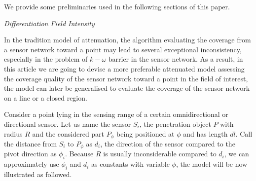 We provide some preliminaries used in the following sections of this paper.
\begin{df}
	{\itshape Differentiation Field Intensity}
\end{df}
In the tradition model of attenuation, the algorithm evaluating the coverage from a sensor network toward a point may lead to several exceptional inconsistency, especially in the problem of $k-\omega$ barrier in the sensor network. As a result, in this article we are going to devise a more preferable attenuated model assessing the coverage quality of the sensor network toward a point in the field of interest, the model can later be generalised to evaluate the coverage of the sensor network on a line or a closed region.

Consider a point lying in the sensing range of a certain omnidirectional  or directional sensor. Let us name the sensor $S_i$, the penetration object $P$ with radius $R$ and the considered part $P_\phi$ being positioned at $\phi$ and has length $dl$. Call the distance from $S_i$ to $P_\phi$ as $d_i$, the direction of the sensor compared to the pivot direction as $\phi_i$. Because $R$ is usually inconsiderable compared to $d_i$, we can approximately use $\phi_i$ and $d_i$ as constants with variable $\phi$, the model will be now illustrated as followed.

